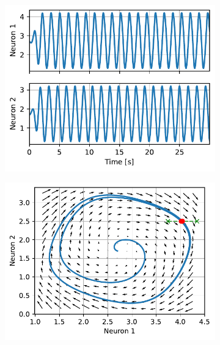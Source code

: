 \documentclass{cmc}
\begin{document}

\begin{figure}[H]
  \centering
  \begin{subfigure}[b]{0.49\textwidth}
    { \centering \includegraphics[width=\textwidth]{figures/Case2_cross_state} }
    \caption{}
  \end{subfigure}
  \begin{subfigure}[b]{0.49\textwidth}
    { \centering \includegraphics[width=\textwidth]{figures/Case2_cross_phase} }
    \caption{}
  \end{subfigure}
  \caption{}
  \label{fig:limit-cycle-poincare}
\end{figure}
\end{document}
